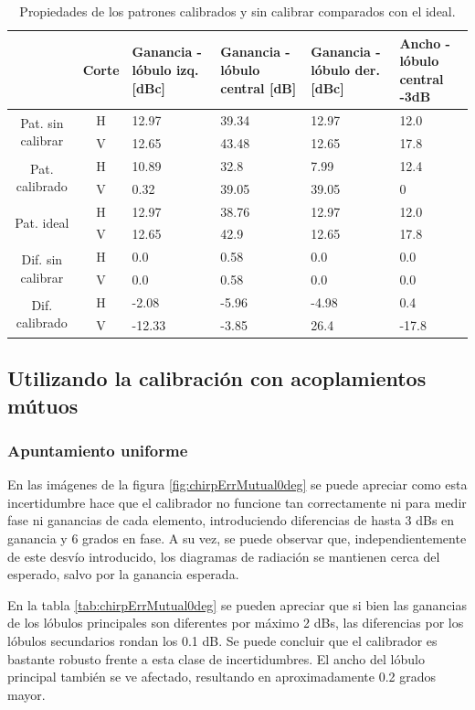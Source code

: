 \begin{table}[H]
  \footnotesize
  \centering
  \begin{tabular}{|c|c|p{2cm}|p{2.5cm}|p{2.5cm}|p{2.5cm}|}
    \cline{2-6}
    \multicolumn{1}{c|}{} & Corte & Ganancia - lóbulo izq. [dBc] & Ganancia - lóbulo central [dB] &
    Ganancia - lóbulo der. [dBc] & Ancho - lóbulo central -3dB \tabularnewline\hline
    \multirow{2}{2cm}{Pat. sin calibrar} & H & 12.97 & 39.34 & 12.97 & 12.0 \tabularnewline\cline{2-6}
     & V & 12.65 & 43.48 & 12.65 & 17.8 \tabularnewline\hline
    \multirow{2}{2cm}{Pat. calibrado} & H & 10.89 & 32.8 & 7.99 & 12.4 \tabularnewline\cline{2-6}
     & V & 0.32 & 39.05 & 39.05 & 0 \tabularnewline\hline
    \multirow{2}{2cm}{Pat. ideal} & H & 12.97 & 38.76 & 12.97 & 12.0 \tabularnewline\cline{2-6}
     & V & 12.65 & 42.9 & 12.65 & 17.8 \tabularnewline\hline
    \multirow{2}{2cm}{Dif. sin calibrar} & H & 0.0 & 0.58 & 0.0 & 0.0\tabularnewline\cline{2-6}
     & V & 0.0 & 0.58 & 0.0 & 0.0 \tabularnewline\hline
    \multirow{2}{2cm}{Dif. calibrado} & H & -2.08 & -5.96 & -4.98 & 0.4 \tabularnewline\cline{2-6}
     & V & -12.33 & -3.85 & 26.4 & -17.8 \tabularnewline\hline
  \end{tabular}
  \caption{Propiedades de los patrones calibrados y sin calibrar comparados con el ideal.}
  \label{tab:chirpErrClassical10degRow}
\end{table}


\subsection{Utilizando la calibración con acoplamientos mútuos}

\subsubsection{Apuntamiento uniforme}

En las imágenes de la figura \ref{fig:chirpErrMutual0deg} se puede apreciar como esta incertidumbre hace que el calibrador 
no funcione tan correctamente ni para medir fase ni ganancias de cada elemento, introduciendo diferencias de hasta 3 dBs en 
ganancia y 6 grados en fase. A su vez, se puede observar que, independientemente de este desvío introducido, los diagramas de 
radiación se mantienen cerca del esperado, salvo por la ganancia esperada.

En la tabla \ref{tab:chirpErrMutual0deg} se pueden apreciar que si bien las ganancias de los lóbulos principales son 
diferentes por máximo 2 dBs, las diferencias por los lóbulos secundarios rondan los 0.1 dB. Se puede concluir que el 
calibrador es bastante robusto frente a esta clase de incertidumbres. El ancho del lóbulo principal también se ve afectado,
resultando en aproximadamente 0.2 grados mayor.

